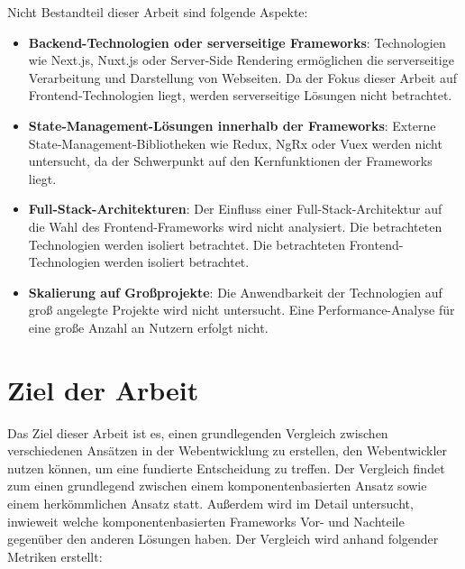 \documentclass[oneside]{ausarbeitung}
\begin{document}
Nicht Bestandteil dieser Arbeit sind folgende Aspekte: 
\begin{itemize}
    \item \textbf{Backend-Technologien oder serverseitige Frameworks}:  
          Technologien wie Next.js, Nuxt.js oder Server-Side Rendering ermöglichen die serverseitige Verarbeitung und Darstellung von Webseiten.  
          Da der Fokus dieser Arbeit auf Frontend-Technologien liegt, werden serverseitige Lösungen nicht betrachtet.
    \item \textbf{State-Management-Lösungen innerhalb der Frameworks}:  
          Externe State-Management-Bibliotheken wie Redux, NgRx oder Vuex werden nicht untersucht, da 		der Schwerpunkt auf den Kernfunktionen der Frameworks liegt.
    \item \textbf{Full-Stack-Architekturen}:  
          Der Einfluss einer Full-Stack-Architektur auf die Wahl des Frontend-Frameworks wird nicht analysiert.  Die betrachteten Technologien werden isoliert betrachtet.
          Die betrachteten Frontend-Technologien werden isoliert betrachtet.
    \item \textbf{Skalierung auf Großprojekte}:  
          Die Anwendbarkeit der Technologien auf groß angelegte Projekte wird nicht untersucht.  
          Eine Performance-Analyse für eine große Anzahl an Nutzern erfolgt nicht.
\end{itemize}



\section{Ziel der Arbeit}
\label{sec:ziel}

Das Ziel dieser Arbeit ist es, einen grundlegenden Vergleich zwischen verschiedenen Ansätzen in der Webentwicklung zu erstellen, den Webentwickler nutzen können, um eine fundierte Entscheidung zu treffen. Der Vergleich findet zum einen grundlegend zwischen einem komponentenbasierten Ansatz sowie einem herkömmlichen Ansatz statt. Außerdem wird im Detail untersucht, inwieweit welche komponentenbasierten Frameworks Vor- und Nachteile gegenüber den anderen Lösungen haben. Der Vergleich wird anhand folgender Metriken erstellt:  
\end{document}
